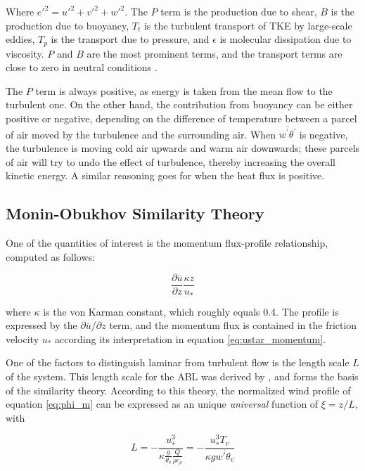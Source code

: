 \documentclass[a4paper]{book}
\begin{document}
Where ${e'}^2={u'}^2+{v'}^2+{w'}^2$. The $P$ term is the production due to shear, $B$ is the production due to buoyancy, $T_t$ is the turbulent transport of TKE by large-scale eddies, $T_p$ is the transport due to pressure, and $\epsilon$ is molecular dissipation due to viscosity. $P$ and $B$ are the most prominent terms, and the transport terms are close to zero in neutral conditions \citep{basicatm}.

The $P$ term is always positive, as energy is taken from the mean flow to the turbulent one. On the other hand, the contribution from buoyancy can be either positive or negative, depending on the difference of temperature between a parcel of air moved by the turbulence and the surrounding air. When $\overline{w^\prime\theta^\prime}$ is negative, the turbulence is moving cold air upwards and warm air downwards; these parcels of air will try to undo the effect of turbulence, thereby increasing the overall kinetic energy. A similar reasoning goes for when the heat flux is positive.

\subsection{Monin-Obukhov Similarity Theory}
\label{sec:most}
One of the quantities of interest is the momentum flux-profile relationship, computed as follows:

\begin{equation}
\label{eq:phi_m}
\frac{\partial\overline{u}}{\partial z}\frac{\kappa z}{u_*}
\end{equation}

where $\kappa$ is the von Karman constant, which roughly equals 0.4. The profile is expressed by the $\partial\overline{u}/\partial z$ term, and the momentum flux is contained in the friction velocity $u_*$ according its interpretation in equation \ref{eq:ustar_momentum}.

One of the factors to distinguish laminar from turbulent flow is the length scale $L$ of the system. This length scale for the ABL was derived by \cite{mostayyyy}, and forms the basis of the similarity theory. According to this theory, the normalized wind profile of equation \ref{eq:phi_m} can be expressed as an unique \emph{universal} function of $\xi=z/L$, with

\begin{equation}
\label{eq:most_l}
L=-\frac{u_*^3}{\kappa\frac{g}{\theta_v}\frac{Q}{\rho c_\rho}}
=-\frac{u_*^3 T_v}{\kappa g \overline{w'\theta_v}}
\end{equation}
\end{document}

